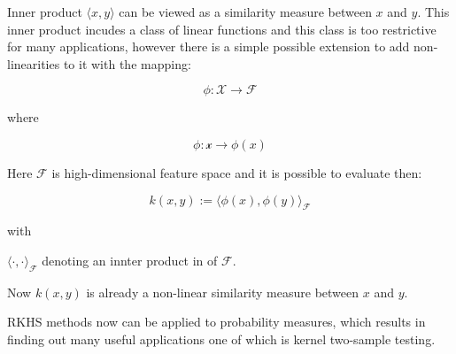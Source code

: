 Inner product $\langle x, y \rangle$ can be viewed as a similarity measure between $x$ and $y$. This inner product incudes a class of linear functions and this class is too restrictive for many applications, however there is a simple possible extension to add non-linearities to it with the mapping:

\begin{equation}
    \phi: \mathcal{X} \rightarrow \mathcal{F}
\end{equation}

where

\begin{equation}
    \phi: \mathcal{x} \rightarrow \phi(x)
\end{equation}

Here $\mathcal{F}$ is high-dimensional feature space and it is possible to evaluate then:

\begin{equation}
    k(x, y) := {\langle\phi(x), \phi(y)\rangle}_{\mathcal{F}}
\end{equation}

with 

${\langle \cdot, \cdot \rangle}_{\mathcal{F}}$ denoting an innter product in of $\mathcal{F}$.

Now $ k(x, y)$ is already a non-linear similarity measure between $x$ and $y$.

RKHS methods now can be applied to probability measures, which results in finding out many useful applications one of which is kernel two-sample testing. 